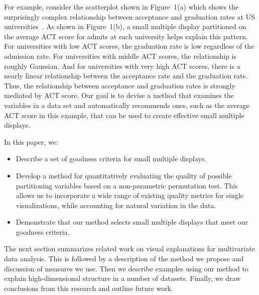 
For example, consider the scatterplot shown in Figure~1(a) which shows the surprisingly complex relationship between acceptance and graduation rates at US universities~\cite{IPEDS}. As shown in Figure~1(b), a small multiple display partitioned on the average ACT score for admits at each university helps explain this pattern.
For universities with low ACT scores, the graduation rate is low regardless of the admission rate.
For universities with middle ACT scores, the relationship is roughly Gaussian.
And for universities with very high ACT scores, there is a nearly linear relationship between the acceptance rate and the graduation rate.
Thus, the relationship between acceptance and graduation rates is strongly mediated by ACT score.
Our goal is to devise a method that examines the variables in a data set and automatically recommends ones, such as the average ACT score in this example, that can be used to create effective small multiple displays.


In this paper, we:
\begin{itemize}
    \item Describe a set of goodness criteria for small multiple displays.
    \item Develop a method for quantitatively evaluating the quality of possible partitioning variables based on a non-parametric permutation test. This allows us to incorporate a wide range of existing quality metrics for single visualizations, while accounting for natural variation in the data.
    \item Demonstrate that our method selects small multiple displays that meet our goodness criteria.
\end{itemize}

The next section summarizes related work on visual explanations for multivariate data analysis. This is followed by a description of the method we propose and discussion of measures we use. Then we describe examples using our method to explain high-dimensional structure in a number of datasets. Finally, we draw conclusions from this research and outline future work.

